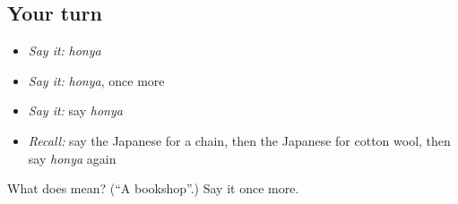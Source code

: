 \subsection*{Your turn}
\begin{itemize}
\raggedright
  \item \emph{Say it:} \emph{honya}
  \item \emph{Say it:} \emph{honya}, once more
  \item \emph{Say it:} say \emph{honya}
  \item \emph{Recall:} say the Japanese for a chain, then the Japanese for cotton wool, then say \emph{honya} again
\end{itemize}

\begin{tcolorbox}[breakable,colback=teal!4,colframe=teal!35!black,title={Before you move on}]
What does  mean? (\textquotedblleft{}A bookshop\textquotedblright{}.) Say it once more.
\end{tcolorbox}
